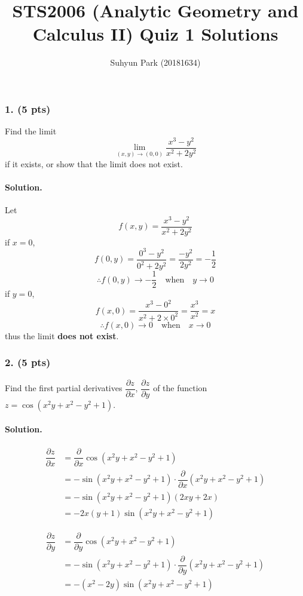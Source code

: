 \documentclass[runningheads]{llncs}
\begin{document}
\title{STS2006 (Analytic Geometry and Calculus II) \newline Quiz 1 Solutions}
\author{Suhyun Park (20181634)}
\maketitle

\subsubsection{1. (5 pts)} Find the limit \[\lim_{\left(x, y\right)\rightarrow\left(0, 0\right)} \dfrac{x^3-y^2}{x^2+2y^2} \] if it exists, or show that the limit does not exist.

\paragraph{Solution.} Let \[f\left(x, y\right) = \dfrac{x^3-y^2}{x^2+2y^2}\]
if $x = 0$, \[f\left(0, y\right) = \dfrac{0^3-y^2}{0^2+2y^2} = \dfrac{-y^2}{2y^2} = -\dfrac{1}{2}\]
\[\therefore f\left(0, y\right)\rightarrow-\dfrac{1}{2}\quad\textrm{when}\quad y\rightarrow0 \]
if $y = 0$, \[f\left(x, 0\right) = \dfrac{x^3-0^2}{x^2+2 \times 0^2} = \dfrac{x^3}{x^2} = x\]
\[\therefore f\left(x, 0\right)\rightarrow0\quad\textrm{when}\quad x\rightarrow0 \]
thus the limit \textbf{does not exist}.

\subsubsection{2. (5 pts)} Find the first partial derivatives $\dfrac{\partial z}{\partial x}$, $\dfrac{\partial z}{\partial y}$ of the function $z = \cos\left(x^2y+x^2-y^2+1\right)$.
\par

\paragraph{Solution.}
\begin{align*}
	\dfrac{\partial z}{\partial x} &= \dfrac{\partial}{\partial x} \cos\left(x^2y+x^2-y^2+1\right)\\
	&= -\sin\left(x^2y+x^2-y^2+1\right)\cdot\dfrac{\partial}{\partial x}\left(x^2y+x^2-y^2+1\right)\\
	&= -\sin\left(x^2y+x^2-y^2+1\right)\left(2xy+2x\right)\\
	&= -2x\left(y+1\right)\sin\left(x^2y+x^2-y^2+1\right)
\end{align*}

\begin{align*}
	\dfrac{\partial z}{\partial y} &= \dfrac{\partial}{\partial y} \cos\left(x^2y+x^2-y^2+1\right)\\
	&= -\sin\left(x^2y+x^2-y^2+1\right)\cdot\dfrac{\partial}{\partial y}\left(x^2y+x^2-y^2+1\right)\\
	&= -\left(x^2-2y\right)\sin\left(x^2y+x^2-y^2+1\right)
\end{align*}
\end{document}
